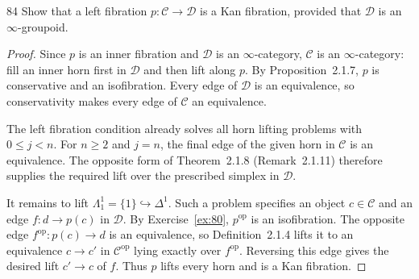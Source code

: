 \begin{exercise}{84}
Show that a left fibration $p\colon\mathcal C\to\mathcal D$ is a Kan fibration,
provided that $\mathcal D$ is an $\infty$-groupoid.

\begin{proof}
Since $p$ is an inner fibration and $\mathcal D$ is an
$\infty$-category, $\mathcal C$ is an $\infty$-category:
fill an inner horn first in $\mathcal D$ and then lift along $p$.
By Proposition~2.1.7, $p$ is conservative and an isofibration.
Every edge of $\mathcal D$ is an equivalence, so
conservativity makes every edge of $\mathcal C$ an equivalence.

The left fibration condition already solves all horn
lifting problems with $0\leq j<n$.
For $n\geq2$ and $j=n$, the final edge of the given horn
in $\mathcal C$ is an equivalence.
The opposite form of Theorem~2.1.8
(Remark~2.1.11) therefore supplies the required lift
over the prescribed simplex in $\mathcal D$.

It remains to lift $\Lambda_1^1=\{1\}\hookrightarrow\Delta^1$.
Such a problem specifies an object $c\in\mathcal C$
and an edge $f\colon d\to p(c)$ in $\mathcal D$.
By Exercise~\ref{ex:80}, $p^{\mathrm{op}}$ is an isofibration.
The opposite edge $f^{\mathrm{op}}\colon p(c)\to d$
is an equivalence, so Definition~2.1.4 lifts it to an
equivalence $c\to c'$ in $\mathcal C^{\mathrm{op}}$
lying exactly over $f^{\mathrm{op}}$.
Reversing this edge gives the desired lift $c'\to c$ of $f$.
Thus $p$ lifts every horn and is a Kan fibration.
\end{proof}
\end{exercise}
